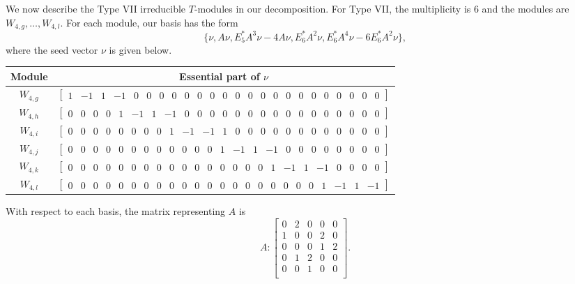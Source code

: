 \documentclass[12pt,letterpaper]{article}
\newcommand{\rowvector}[1]{\begin{bmatrix} #1 \end{bmatrix}}
\begin{document}
We now describe the Type VII irreducible $T$-modules in our decomposition. For Type VII, the multiplicity is 6 and the modules are $W_{4,g},\dots,W_{4,l}$. For each module, our basis has the form 
\begin{equation*}
    \{\nu, A\nu, E_5^*A^3\nu - 4A\nu, E_6^*A^2\nu,  E_6^*A^4\nu - 6E_6^*A^2\nu\},
\end{equation*}
where the seed vector $\nu$ is given below.
\begin{center}
    \begin{tabular}{c | c}
    \toprule
       \textbf{Module}  & \textbf {Essential part of }$\nu$ \\
       \midrule
       $W_{4,g}$  & $\rowvector{1 & -1 & 1 & -1 & 0 & 0 & 0 & 0 & 0 & 0 & 0 & 0 & 0 & 0 & 0 & 0 & 0 & 0 & 0 & 0 & 0 & 0 & 0 & 0}$ \\[1.67pt]
       $W_{4,h}$  & $\rowvector{0 & 0 & 0 & 0 & 1 & -1 & 1 & -1 & 0 & 0 & 0 & 0 & 0 & 0 & 0 & 0 & 0 & 0 & 0 & 0 & 0 & 0 & 0 & 0}$ \\[1.67pt]
       $W_{4,i}$  & $\rowvector{0 & 0 & 0 & 0 & 0 & 0 & 0 & 0 & 1 & -1 & -1 & 1 & 0 & 0 & 0 & 0 & 0 & 0 & 0 & 0 & 0 & 0 & 0 & 0}$ \\[1.67pt]
       $W_{4,j}$  & $\rowvector{0 & 0 & 0 & 0 & 0 & 0 & 0 & 0 & 0 & 0 & 0 & 0 & 1 & -1 & 1 & -1 & 0 & 0 & 0 & 0 & 0 & 0 & 0 & 0}$ \\[1.67pt]
       $W_{4,k}$  & $\rowvector{0 & 0 & 0 & 0 & 0 & 0 & 0 & 0 & 0 & 0 & 0 & 0 & 0 & 0 & 0 & 0 & 1 & -1 & 1 & -1 & 0 & 0 & 0 & 0}$ \\[1.67pt]
       $W_{4,l}$  & $\rowvector{0 & 0 & 0 & 0 & 0 & 0 & 0 & 0 & 0 & 0 & 0 & 0 & 0 & 0 & 0 & 0 & 0 & 0 & 0 & 0 & 1 & -1 & 1 & -1}$ \\
    \bottomrule
    \end{tabular}
\end{center}

With respect to each basis, the matrix representing $A$ is 
\begin{equation}
    A: \begin{bmatrix}
  0 & 2 & 0 & 0 & 0 \\
  1 & 0 & 0 & 2 & 0 \\
  0 & 0 & 0 & 1 & 2 \\
  0 & 1 & 2 & 0 & 0 \\
  0 & 0 & 1 & 0 & 0 \\
\end{bmatrix}.
\label{eq:t12-VII}
\end{equation}
\end{document}

